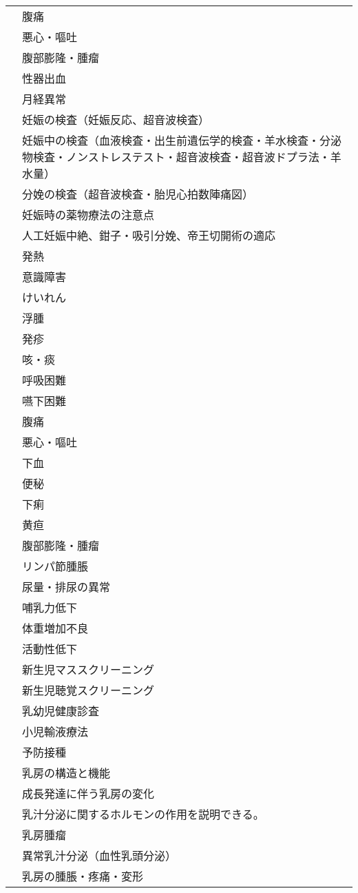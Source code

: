 \begin{xltabular}{\linewidth}{XX}
 & 腹痛 \\
 & 悪心・嘔吐 \\
 & 腹部膨隆・腫瘤 \\
 & 性器出血 \\
 & 月経異常 \\
 & 妊娠の検査（妊娠反応、超音波検査） \\
 & 妊娠中の検査（血液検査・出生前遺伝学的検査・羊水検査・分泌物検査・ノンストレステスト・超音波検査・超音波ドプラ法・羊水量） \\
 & 分娩の検査（超音波検査・胎児心拍数陣痛図） \\
 & 妊娠時の薬物療法の注意点 \\
 & 人工妊娠中絶、鉗子・吸引分娩、帝王切開術の適応 \\
 & 発熱 \\
 & 意識障害 \\
 & けいれん \\
 & 浮腫 \\
 & 発疹 \\
 & 咳・痰 \\
 & 呼吸困難 \\
 & 嚥下困難 \\
 & 腹痛 \\
 & 悪心・嘔吐 \\
 & 下血 \\
 & 便秘 \\
 & 下痢 \\
 & 黄疸 \\
 & 腹部膨隆・腫瘤 \\
 & リンパ節腫脹 \\
 & 尿量・排尿の異常 \\
 & 哺乳力低下 \\
 & 体重増加不良 \\
 & 活動性低下 \\
 & 新生児マススクリーニング \\
 & 新生児聴覚スクリーニング \\
 & 乳幼児健康診査 \\
 & 小児輸液療法 \\
 & 予防接種 \\
 & 乳房の構造と機能 \\
 & 成長発達に伴う乳房の変化 \\
 & 乳汁分泌に関するホルモンの作用を説明できる。 \\
 & 乳房腫瘤 \\
 & 異常乳汁分泌（血性乳頭分泌） \\
 & 乳房の腫脹・疼痛・変形 \\

\end{xltabular}
